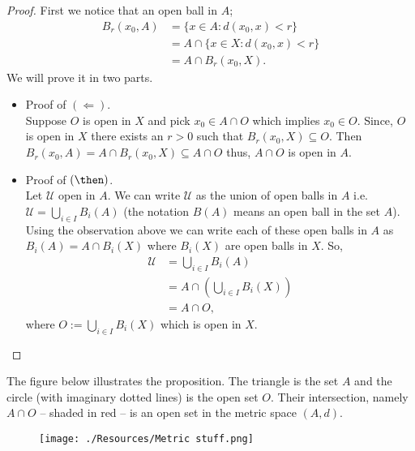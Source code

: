 \documentclass[12pt, a4paper]{article}
\begin{document}
\begin{proof}
    First we notice that an open ball in \(A\);
    \[\begin{aligned}
        B_r(x_0,A) &= \{x \in A: d(x_0,x)<r\} \\
        &= A \cap \{x \in X : d(x_0,x)<r\} \\
        &= A \cap B_r(x_0,X).
    \end{aligned}\]
    We will prove it in two parts.
    \begin{itemize}
        \item Proof of \((\Leftarrow)\). \\
        Suppose \(O\) is open in \(X\) and pick \(x_0 \in A\cap O\) which implies \(x_0 \in O\). Since, \(O\) is open in \(X\) there exists an \(r>0\) such that \(B_r(x_0,X) \subseteq O\). Then \(B_r(x_0,A) = A \cap B_r(x_0,X) \subseteq A \cap O\) thus, \(A \cap O\) is open in \(A\).
        \item Proof of \((\then)\). \\
        Let \(\mathcal{U}\) open in \(A\). We can write \(\mathcal{U}\) as the union of open balls in \(A\) i.e. \(\mathcal{U} = \bigcup_{i \in I} B_i(A)\) (the notation \(B(A)\) means an open ball in the set \(A\)). Using the observation above we can write each of these open balls in \(A\) as \(B_i(A) = A \cap B_i(X)\) where \(B_i(X)\) are open balls in \(X\). So, 
        \[\begin{aligned}
            \mathcal{U} &= \bigcup_{i\in I} B_i(A) \\
            &= A \cap \left( \bigcup_{i \in I} B_i(X) \right) \\
            &= A \cap O,
        \end{aligned}\]
        where \(O:= \bigcup_{i \in I} B_i(X)\) which is open in \(X\).
    \end{itemize}
\end{proof}

The figure below illustrates the proposition. The triangle is the set \(A\) and the circle (with imaginary dotted lines) is the open set \(O\). Their intersection, namely \(A \cap O\) -- shaded in red -- is an open set in the metric space \((A,d)\).

\begin{figure}[H]
     \begin{center}
         \texttt{[image: ./Resources/Metric stuff.png]}
     \end{center}
\end{figure}
\end{document}
